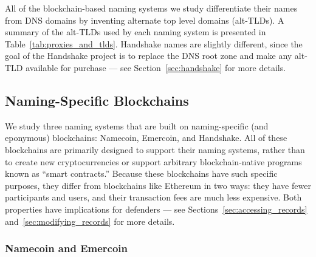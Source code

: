All of the blockchain-based naming systems we study differentiate their names 
from DNS domains by inventing alternate top level domains (alt-TLDs). A 
summary of the alt-TLDs used by each naming system is presented in 
Table~\ref{tab:proxies_and_tlds}. Handshake names are slightly different, since 
the goal of the Handshake project is to replace the DNS root zone and make any 
alt-TLD available for purchase --- see Section~\ref{sec:handshake} for more 
details.


\subsection{Naming-Specific Blockchains}

We study three naming systems that are built on 
naming-specific (and eponymous) blockchains: 
Namecoin, Emercoin, and Handshake. All of these blockchains 
are primarily designed to support their naming systems,  
rather than to create new cryptocurrencies or support arbitrary 
blockchain-native programs known as ``smart contracts.'' Because these 
blockchains have such specific purposes, they differ 
from blockchains like Ethereum in two ways: they have fewer 
participants and users, and their transaction fees are much 
less expensive. Both properties have implications for 
defenders --- see Sections~\ref{sec:accessing_records} 
and~\ref{sec:modifying_records} for more details. 

\subsubsection{Namecoin and Emercoin}

